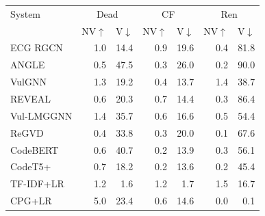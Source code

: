 \begin{tabular}{lrrrrrr}
\toprule
System & \multicolumn{2}{c}{Dead} & \multicolumn{2}{c}{CF} & \multicolumn{2}{c}{Ren} \\
 & NV$\uparrow$ & V$\downarrow$ & NV$\uparrow$ & V$\downarrow$ & NV$\uparrow$ & V$\downarrow$ \\
\midrule
ECG RGCN & 1.0 & 14.4 & 0.9 & 19.6 & 0.4 & 81.8 \\
ANGLE & 0.5 & 47.5 & 0.3 & 26.0 & 0.2 & 90.0 \\
VulGNN & 1.3 & 19.2 & 0.4 & 13.7 & 1.4 & 38.7 \\
REVEAL & 0.6 & 20.3 & 0.7 & 14.4 & 0.3 & 86.4 \\
Vul-LMGGNN & 1.4 & 35.7 & 0.6 & 16.6 & 0.5 & 54.4 \\
ReGVD & 0.4 & 33.8 & 0.3 & 20.0 & 0.1 & 67.6 \\
CodeBERT & 0.6 & 40.7 & 0.2 & 13.9 & 0.3 & 56.1 \\
CodeT5+ & 0.7 & 18.2 & 0.2 & 13.6 & 0.2 & 45.4 \\
TF-IDF+LR & 1.2 & 1.6 & 1.2 & 1.7 & 1.5 & 16.7 \\
CPG+LR & 5.0 & 23.4 & 0.6 & 14.6 & 0.0 & 0.1 \\
\bottomrule
\end{tabular}
